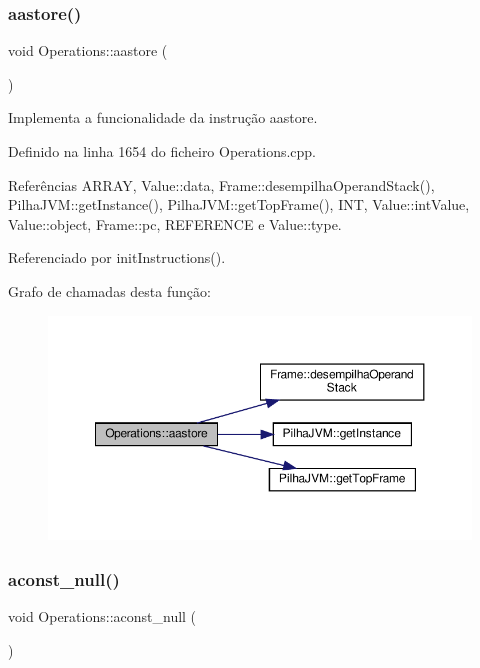 \subsubsection{\texorpdfstring{aastore()}{aastore()}}
{\footnotesize\ttfamily void Operations\+::aastore (\begin{DoxyParamCaption}{ }\end{DoxyParamCaption})\hspace{0.3cm}{\ttfamily [private]}}



Implementa a funcionalidade da instrução aastore. 



Definido na linha 1654 do ficheiro Operations.\+cpp.



Referências A\+R\+R\+AY, Value\+::data, Frame\+::desempilha\+Operand\+Stack(), Pilha\+J\+V\+M\+::get\+Instance(), Pilha\+J\+V\+M\+::get\+Top\+Frame(), I\+NT, Value\+::int\+Value, Value\+::object, Frame\+::pc, R\+E\+F\+E\+R\+E\+N\+CE e Value\+::type.



Referenciado por init\+Instructions().

Grafo de chamadas desta função\+:
\nopagebreak
\begin{figure}[H]
\begin{center}
\leavevmode
\includegraphics[width=350pt]{classOperations_a60b30bd84b2d59334e735f0adda6febe_cgraph}
\end{center}
\end{figure}
\mbox{\label{classOperations_af51ec8a98d9ed3167da0d8ac6279a1cd}} 
\subsubsection{\texorpdfstring{aconst\+\_\+null()}{aconst\_null()}}
{\footnotesize\ttfamily void Operations\+::aconst\+\_\+null (\begin{DoxyParamCaption}{ }\end{DoxyParamCaption})\hspace{0.3cm}{\ttfamily [private]}}



